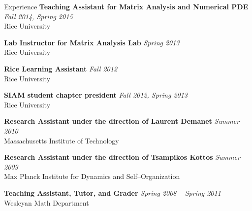 \documentclass{resume} %
\begin{document}
\begin{rSection}{Experience}
{\bf Teaching Assistant for Matrix Analysis and Numerical PDE} \hfill {\em Fall 2014, Spring 2015} \\
{\small Rice University}

{\bf Lab Instructor for Matrix Analysis Lab} \hfill {\em Spring 2013} \\
{\small Rice University}

{\bf Rice Learning Assistant} \hfill {\em Fall 2012} \\
{\small Rice University}

{\bf SIAM student chapter president} \hfill {\em Fall 2012, Spring 2013} \\
{\small Rice University}

{\bf Research Assistant under the direction of Laurent Demanet} \hfill {\em Summer 2010} \\
{\small Massachusetts Institute of Technology}

{\bf Research Assistant under the direction of Tsampikos Kottos} \hfill {\em Summer 2009} \\
{\small Max Planck Institute for Dynamics and Self--Organization}

{\bf Teaching Assistant, Tutor, and Grader} \hfill {\em Spring 2008 -- Spring 2011} \\
{\small Wesleyan Math Department}

\end{rSection}
\end{document}

